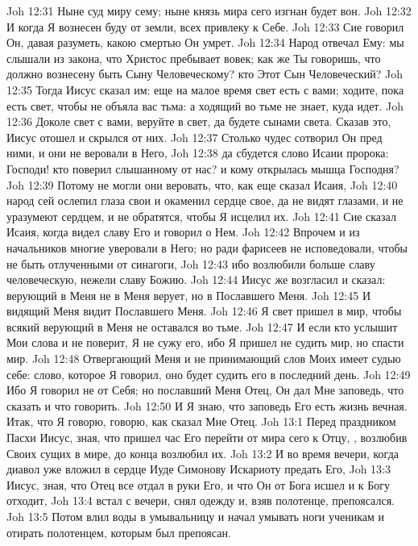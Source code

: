 \vs Joh 12:31 Ныне суд миру сему; ныне князь мира сего изгнан будет вон.
\vs Joh 12:32 И когда Я вознесен буду от земли, всех привлеку к Себе.
\vs Joh 12:33 Сие говорил Он, давая разуметь, какою смертью Он умрет.
\vs Joh 12:34 Народ отвечал Ему: мы слышали из закона, что Христос пребывает вовек; как же Ты говоришь, что должно вознесену быть Сыну Человеческому? кто Этот Сын Человеческий?
\vs Joh 12:35 Тогда Иисус сказал им: еще на малое время свет есть с вами; ходите, пока есть свет, чтобы не объяла вас тьма: а ходящий во тьме не знает, куда идет.
\vs Joh 12:36 Доколе свет с вами, веруйте в свет, да будете сынами света. Сказав это, Иисус отошел и скрылся от них.
\vs Joh 12:37 Столько чудес сотворил Он пред ними, и они не веровали в Него,
\vs Joh 12:38 да сбудется слово Исаии пророка: Господи! кто поверил слышанному от нас? и кому открылась мышца Господня?
\vs Joh 12:39 Потому не могли они веровать, что, как еще сказал Исаия,
\vs Joh 12:40 народ сей ослепил глаза свои и окаменил сердце свое, да не видят глазами, и не уразумеют сердцем, и не обратятся, чтобы Я исцелил их.
\vs Joh 12:41 Сие сказал Исаия, когда видел славу Его и говорил о Нем.
\vs Joh 12:42 Впрочем и из начальников многие уверовали в Него; но ради фарисеев не исповедовали, чтобы не быть отлученными от синагоги,
\vs Joh 12:43 ибо возлюбили больше славу человеческую, нежели славу Божию.
\vs Joh 12:44 Иисус же возгласил и сказал: верующий в Меня не в Меня верует, но в Пославшего Меня.
\vs Joh 12:45 И видящий Меня видит Пославшего Меня.
\vs Joh 12:46 Я свет пришел в мир, чтобы всякий верующий в Меня не оставался во тьме.
\vs Joh 12:47 И если кто услышит Мои слова и не поверит, Я не сужу его, ибо Я пришел не судить мир, но спасти мир.
\vs Joh 12:48 Отвергающий Меня и не принимающий слов Моих имеет судью себе: слово, которое Я говорил, оно будет судить его в последний день.
\vs Joh 12:49 Ибо Я говорил не от Себя; но пославший Меня Отец, Он дал Мне заповедь, что сказать и что говорить.
\vs Joh 12:50 И Я знаю, что заповедь Его есть жизнь вечная. Итак, что Я говорю, говорю, как сказал Мне Отец.
\vs Joh 13:1 Перед праздником Пасхи Иисус, зная, что пришел час Его перейти от мира сего к Отцу, , возлюбив Своих сущих в мире, до конца возлюбил их.
\vs Joh 13:2 И во время вечери, когда диавол уже вложил в сердце Иуде Симонову Искариоту предать Его,
\vs Joh 13:3 Иисус, зная, что Отец все отдал в руки Его, и что Он от Бога исшел и к Богу отходит,
\vs Joh 13:4 встал с вечери, снял  одежду и, взяв полотенце, препоясался.
\vs Joh 13:5 Потом влил воды в умывальницу и начал умывать ноги ученикам и отирать полотенцем, которым был препоясан.
